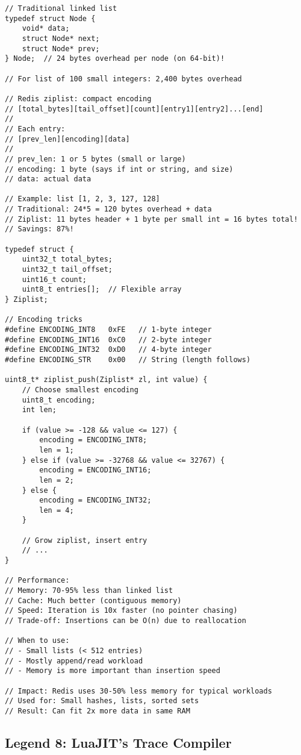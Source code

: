 \begin{lstlisting}
// Traditional linked list
typedef struct Node {
    void* data;
    struct Node* next;
    struct Node* prev;
} Node;  // 24 bytes overhead per node (on 64-bit)!

// For list of 100 small integers: 2,400 bytes overhead

// Redis ziplist: compact encoding
// [total_bytes][tail_offset][count][entry1][entry2]...[end]
//
// Each entry:
// [prev_len][encoding][data]
//
// prev_len: 1 or 5 bytes (small or large)
// encoding: 1 byte (says if int or string, and size)
// data: actual data

// Example: list [1, 2, 3, 127, 128]
// Traditional: 24*5 = 120 bytes overhead + data
// Ziplist: 11 bytes header + 1 byte per small int = 16 bytes total!
// Savings: 87%!

typedef struct {
    uint32_t total_bytes;
    uint32_t tail_offset;
    uint16_t count;
    uint8_t entries[];  // Flexible array
} Ziplist;

// Encoding tricks
#define ENCODING_INT8   0xFE   // 1-byte integer
#define ENCODING_INT16  0xC0   // 2-byte integer
#define ENCODING_INT32  0xD0   // 4-byte integer
#define ENCODING_STR    0x00   // String (length follows)

uint8_t* ziplist_push(Ziplist* zl, int value) {
    // Choose smallest encoding
    uint8_t encoding;
    int len;

    if (value >= -128 && value <= 127) {
        encoding = ENCODING_INT8;
        len = 1;
    } else if (value >= -32768 && value <= 32767) {
        encoding = ENCODING_INT16;
        len = 2;
    } else {
        encoding = ENCODING_INT32;
        len = 4;
    }

    // Grow ziplist, insert entry
    // ...
}

// Performance:
// Memory: 70-95% less than linked list
// Cache: Much better (contiguous memory)
// Speed: Iteration is 10x faster (no pointer chasing)
// Trade-off: Insertions can be O(n) due to reallocation

// When to use:
// - Small lists (< 512 entries)
// - Mostly append/read workload
// - Memory is more important than insertion speed

// Impact: Redis uses 30-50% less memory for typical workloads
// Used for: Small hashes, lists, sorted sets
// Result: Can fit 2x more data in same RAM
\end{lstlisting}

\subsection{Legend 8: LuaJIT's Trace Compiler}

